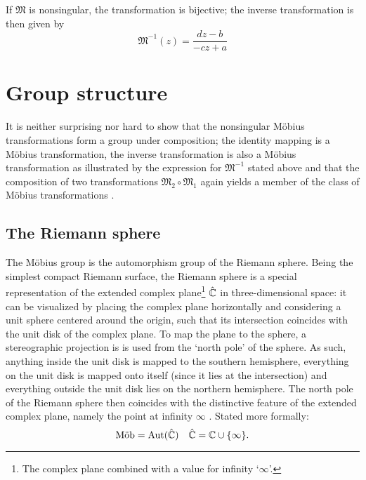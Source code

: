 If \(\mathfrak{M}\) is nonsingular, the transformation is bijective; the inverse transformation is then given by \cite{Needham1997}
\[ \mathfrak{M}^{-1}(z) = \frac{dz - b}{-cz + a} \]

\section{Group structure}
It is neither surprising nor hard to show that the nonsingular Möbius transformations form a group under composition; the identity mapping is a Möbius transformation, the inverse transformation is also a Möbius transformation as illustrated by the expression for \(\mathfrak{M}^{-1}\) stated above and that the composition of two transformations \(\mathfrak{M}_2 \circ \mathfrak{M}_1\) again yields a member of the class of Möbius transformations \cite{Needham1997}. 

\subsection{The Riemann sphere}
The Möbius group \moebiusgroup is the automorphism group of the Riemann sphere. Being the simplest compact Riemann surface, the Riemann sphere is a special representation of the extended complex plane\footnote{The complex plane combined with a value for infinity `\(\infty\)'.} \(\hat{\complex}\) in three-dimensional space: it can be visualized by placing the complex plane horizontally and considering a unit sphere centered around the origin, such that its intersection coincides with the unit disk of the complex plane. To map the plane to the sphere, a stereographic projection is is used from the `north pole' of the sphere. As such, anything inside the unit disk is mapped to the southern hemisphere, everything on the unit disk is mapped onto itself (since it lies at the intersection) and everything outside the unit disk lies on the northern hemisphere. The north pole of the Riemann sphere then coincides with the distinctive feature of the extended complex plane, namely the point at infinity \(\infty\) \cite{Needham1997}. Stated more formally:
\[ \moebiusgroup = \automorphgroup{\hat{\complex}} \quad \hat{\complex} = \complex \cup \{\infty\}.\]

